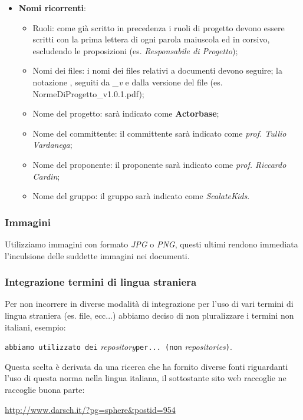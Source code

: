 \documentclass{scalatekids-article}
\begin{document}
\begin{itemize}
\item \textbf{Nomi ricorrenti}:
  \begin{itemize}
  \item Ruoli: come già scritto in precedenza i ruoli di progetto devono essere scritti con la prima lettera di ogni parola maiuscola ed in corsivo, escludendo le proposizioni (es. \textit{Responsabile di Progetto});
  \item Nomi dei files: i nomi dei files relativi a documenti devono seguire;
    la notazione \textit{}, seguiti da \textit{\_v} e dalla
    versione del file (es. NormeDiProgetto\_v1.0.1.pdf);
  \item Nome del progetto: sarà indicato come \textbf{Actorbase};
  \item Nome del committente: il committente sarà indicato come \textit{prof. Tullio Vardanega};
  \item Nome del proponente: il proponente sarà indicato come \textit{prof. Riccardo Cardin};
  \item Nome del gruppo: il gruppo sarà indicato come \textit{ScalateKids}.
  \end{itemize}
\end{itemize}

\subsubsection{Immagini}
Utilizziamo immagini con formato \textit{JPG} o \textit{PNG}, questi ultimi rendono immediata l'inculsione delle suddette immagini nei documenti.

\subsubsection{Integrazione termini di lingua straniera}
Per non incorrere in diverse modalità di integrazione per l'uso di vari termini di lingua straniera (es. file,  ecc...) abbiamo deciso di non pluralizzare i termini non italiani, esempio:\\
\begin{center}
  \verb=abbiamo utilizzato dei= \textit{repository}\verb=per... (non= \textit{repositories}\verb=)=.
\end{center}
Questa scelta è derivata da una ricerca che ha fornito diverse fonti riguardanti l'uso di questa norma nella lingua italiana, il sottostante sito web raccoglie ne raccoglie buona parte:\\
\begin{center}
  \url{http://www.darsch.it/?pg=sphere&postid=954}
\end{center}
\end{document}
